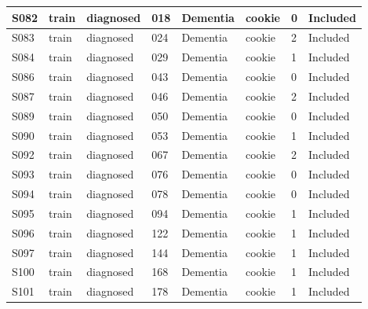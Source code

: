 \begin{center}
\begin{longtable}{|l|l|l|l|l|l|l|l|}
S082           & train                 & diagnosed         & 018     & Dementia       & cookie          & 0            & Included      \\ \hline
S083           & train                 & diagnosed         & 024     & Dementia       & cookie          & 2            & Included      \\ \hline
S084           & train                 & diagnosed         & 029     & Dementia       & cookie          & 1            & Included      \\ \hline
S086           & train                 & diagnosed         & 043     & Dementia       & cookie          & 0            & Included      \\ \hline
S087           & train                 & diagnosed         & 046     & Dementia       & cookie          & 2            & Included      \\ \hline
S089           & train                 & diagnosed         & 050     & Dementia       & cookie          & 0            & Included      \\ \hline
S090           & train                 & diagnosed         & 053     & Dementia       & cookie          & 1            & Included      \\ \hline
S092           & train                 & diagnosed         & 067     & Dementia       & cookie          & 2            & Included      \\ \hline
S093           & train                 & diagnosed         & 076     & Dementia       & cookie          & 0            & Included      \\ \hline
S094           & train                 & diagnosed         & 078     & Dementia       & cookie          & 0            & Included      \\ \hline
S095           & train                 & diagnosed         & 094     & Dementia       & cookie          & 1            & Included      \\ \hline
S096           & train                 & diagnosed         & 122     & Dementia       & cookie          & 1            & Included      \\ \hline
S097           & train                 & diagnosed         & 144     & Dementia       & cookie          & 1            & Included      \\ \hline
S100           & train                 & diagnosed         & 168     & Dementia       & cookie          & 1            & Included      \\ \hline
S101           & train                 & diagnosed         & 178     & Dementia       & cookie          & 1            & Included      \\ \hline

\end{longtable}
\end{center}
